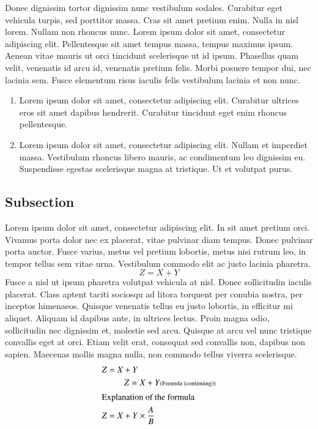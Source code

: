 \documentclass[english,fleqn]{ieej-tec2}%
\begin{document}
Donec dignissim tortor dignissim nunc vestibulum sodales. Curabitur eget vehicula turpis, sed porttitor massa. Cras sit amet pretium enim. Nulla in nisl lorem. Nullam non rhoncus nunc. Lorem ipsum dolor sit amet, consectetur adipiscing elit. Pellentesque sit amet tempus massa, tempus maximus ipsum. Aenean vitae mauris ut orci tincidunt scelerisque ut id ipsum. Phasellus quam velit, venenatis id arcu id, venenatis pretium felis. Morbi posuere tempor dui, nec lacinia sem. Fusce elementum risus iaculis felis vestibulum lacinia et non nunc.

\begin{enumerate}
\item
Lorem ipsum dolor sit amet, consectetur adipiscing elit. Curabitur ultrices eros sit amet dapibus hendrerit. Curabitur tincidunt eget enim rhoncus pellentesque.
\item
Lorem ipsum dolor sit amet, consectetur adipiscing elit. Nullam et imperdiet massa. Vestibulum rhoncus libero mauris, ac condimentum leo dignissim eu. Suspendisse egestas scelerisque magna at tristique. Ut et volutpat purus.
\end{enumerate}

\subsection{Subsection}
Lorem ipsum dolor sit amet, consectetur adipiscing elit. In sit amet pretium orci. Vivamus porta dolor nec ex placerat, vitae pulvinar diam tempus. Donec pulvinar porta auctor. Fusce varius, metus vel pretium lobortis, metus nisi rutrum leo, in tempor tellus sem vitae urna. Vestibulum commodo elit ac justo lacinia pharetra.
%
\begin{equation}
Z = X + Y
\end{equation}
%
Fusce a nisl ut ipsum pharetra volutpat vehicula at nisl. Donec sollicitudin iaculis placerat. Class aptent taciti sociosqu ad litora torquent per conubia nostra, per inceptos himenaeos. Quisque venenatis tellus eu justo lobortis, in efficitur mi aliquet. Aliquam id dapibus ante, in ultrices lectus. Proin magna odio, sollicitudin nec dignissim et, molestie sed arcu. Quisque at arcu vel nunc tristique convallis eget at orci. Etiam velit erat, consequat sed convallis non, dapibus non sapien. Maecenas mollis magna nulla, non commodo tellus viverra scelerisque.
%
\begin{align}
Z &= X + Y \notag\\
& \qquad Z = X + Y \text{\scriptsize (Formula (continuing))} \\
\intertext{Explanation of the formula%
}
Z &= X + Y \times \frac AB
\end{align}
\end{document}
